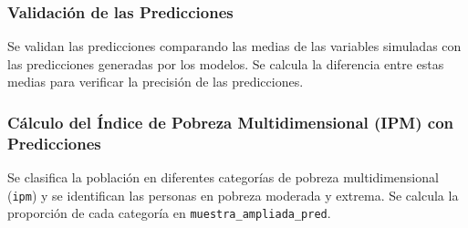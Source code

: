 \documentclass[
  12pt,
]{book}
\newenvironment{Shaded}{\begin{snugshade}}{\end{snugshade}}
\newcommand{\FunctionTok}[1]{\textcolor[rgb]{0.13,0.29,0.53}{\textbf{#1}}}
\newcommand{\NormalTok}[1]{#1}
\newcommand{\SpecialCharTok}[1]{\textcolor[rgb]{0.81,0.36,0.00}{\textbf{#1}}}
\begin{document}
\hypertarget{validaciuxf3n-de-las-predicciones}{%
\subsubsection*{Validación de las Predicciones}\label{validaciuxf3n-de-las-predicciones}}

Se validan las predicciones comparando las medias de las variables simuladas con las predicciones generadas por los modelos. Se calcula la diferencia entre estas medias para verificar la precisión de las predicciones.

\begin{Shaded}
\end{Shaded}

\hypertarget{cuxe1lculo-del-uxedndice-de-pobreza-multidimensional-ipm-con-predicciones}{%
\subsubsection*{Cálculo del Índice de Pobreza Multidimensional (IPM) con Predicciones}\label{cuxe1lculo-del-uxedndice-de-pobreza-multidimensional-ipm-con-predicciones}}

Se clasifica la población en diferentes categorías de pobreza multidimensional (\texttt{ipm}) y se identifican las personas en pobreza moderada y extrema. Se calcula la proporción de cada categoría en \texttt{muestra\_ampliada\_pred}.
\end{document}
